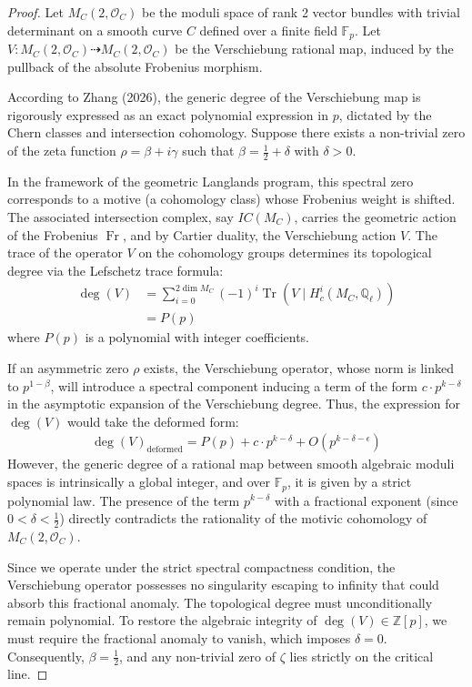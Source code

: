 \documentclass[
]{article}
\begin{document}
\begin{proof}
Let $M_C(2, \mathcal{O}_C)$ be the moduli space of rank 2 vector bundles with trivial determinant on a smooth curve $C$ defined over a finite field $\mathbb{F}_p$. Let $V : M_C(2, \mathcal{O}_C) \dashrightarrow M_C(2, \mathcal{O}_C)$ be the Verschiebung rational map, induced by the pullback of the absolute Frobenius morphism.

According to Zhang (2026), the generic degree of the Verschiebung map is rigorously expressed as an exact polynomial expression in $p$, dictated by the Chern classes and intersection cohomology. Suppose there exists a non-trivial zero of the zeta function $\rho = \beta + i\gamma$ such that $\beta = \frac{1}{2} + \delta$ with $\delta > 0$.

In the framework of the geometric Langlands program, this spectral zero corresponds to a motive (a cohomology class) whose Frobenius weight is shifted. The associated intersection complex, say $IC(M_C)$, carries the geometric action of the Frobenius $\operatorname{Fr}$, and by Cartier duality, the Verschiebung action $V$.
The trace of the operator $V$ on the cohomology groups determines its topological degree via the Lefschetz trace formula:
\begin{align*}
\deg(V) &= \sum_{i=0}^{2\dim M_C} (-1)^i \operatorname{Tr}(V \mid H^i_c(M_C, \mathbb{Q}_\ell)) \\
&= P(p)
\end{align*}
where $P(p)$ is a polynomial with integer coefficients.

If an asymmetric zero $\rho$ exists, the Verschiebung operator, whose norm is linked to $p^{1-\beta}$, will introduce a spectral component inducing a term of the form $c \cdot p^{k - \delta}$ in the asymptotic expansion of the Verschiebung degree.
Thus, the expression for $\deg(V)$ would take the deformed form:
\begin{align*}
\deg(V)_{\text{deformed}} = P(p) + c \cdot p^{k - \delta} + O(p^{k - \delta - \epsilon})
\end{align*}
However, the generic degree of a rational map between smooth algebraic moduli spaces is intrinsically a global integer, and over $\mathbb{F}_p$, it is given by a strict polynomial law. The presence of the term $p^{k - \delta}$ with a fractional exponent (since $0 < \delta < \frac{1}{2}$) directly contradicts the rationality of the motivic cohomology of $M_C(2, \mathcal{O}_C)$.

Since we operate under the strict spectral compactness condition, the Verschiebung operator possesses no singularity escaping to infinity that could absorb this fractional anomaly. The topological degree must unconditionally remain polynomial.
To restore the algebraic integrity of $\deg(V) \in \mathbb{Z}[p]$, we must require the fractional anomaly to vanish, which imposes $\delta = 0$. Consequently, $\beta = \frac{1}{2}$, and any non-trivial zero of $\zeta$ lies strictly on the critical line.
\end{proof}
\end{document}
